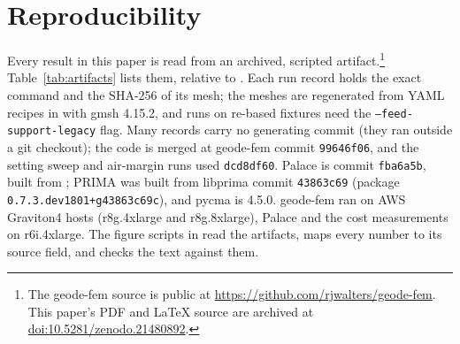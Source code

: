 \documentclass{anvil-paper}
\begin{document}
\section{Reproducibility}
\label{sec:repro}

Every result in this paper is read from an archived, scripted
artifact.\footnote{The geode-fem source is public at
\url{https://github.com/rjwalters/geode-fem}. This paper's PDF and \LaTeX{}
source are archived at
\href{https://doi.org/10.5281/zenodo.21480892}{doi:10.5281/zenodo.21480892}.}
Table~\ref{tab:artifacts} lists them, relative to
. Each run record holds the exact
command and the SHA-256 of its mesh; the meshes are regenerated from YAML
recipes in  with gmsh 4.15.2, and runs on re-based
fixtures need the \texttt{--feed-support-legacy} flag. Many records carry no
generating commit (they ran outside a git checkout); the code is merged at
geode-fem commit \texttt{99646f06}, and the setting sweep and air-margin
runs used \texttt{dcd8df60}. Palace is commit \texttt{fba6a5b}, built from
; PRIMA was built from libprima
commit \texttt{43863c69} (package \texttt{0.7.3.dev1801+g43863c69c}), and
pycma is 4.5.0. geode-fem ran on AWS Graviton4 hosts (r8g.4xlarge and
r8g.8xlarge), Palace and the cost measurements on r6i.4xlarge. The figure
scripts in  read the artifacts,  maps
every number to its source field, and  checks the
text against them.
\end{document}

